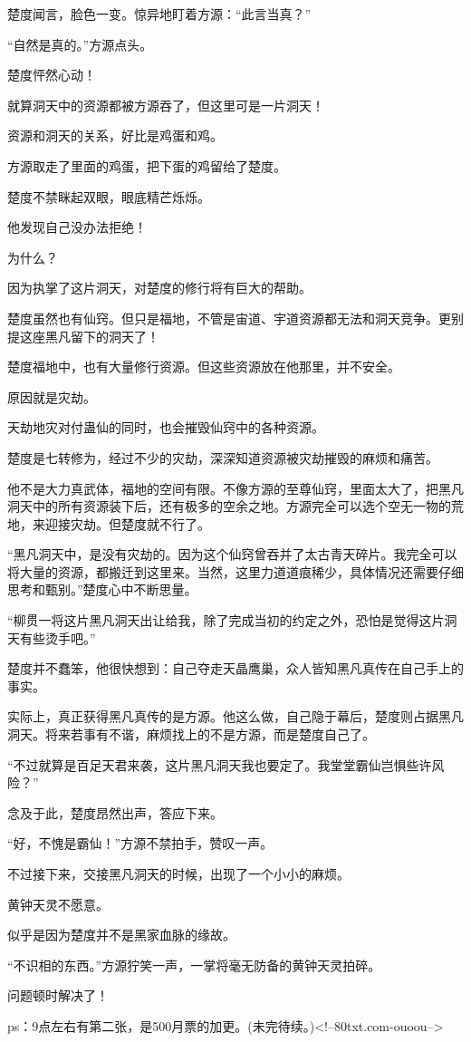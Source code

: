 \begin{this_body}
楚度闻言，脸色一变。惊异地盯着方源：“此言当真？”

“自然是真的。”方源点头。

楚度怦然心动！

就算洞天中的资源都被方源吞了，但这里可是一片洞天！

资源和洞天的关系，好比是鸡蛋和鸡。

方源取走了里面的鸡蛋，把下蛋的鸡留给了楚度。

楚度不禁眯起双眼，眼底精芒烁烁。

他发现自己没办法拒绝！

为什么？

因为执掌了这片洞天，对楚度的修行将有巨大的帮助。

楚度虽然也有仙窍。但只是福地，不管是宙道、宇道资源都无法和洞天竞争。更别提这座黑凡留下的洞天了！

楚度福地中，也有大量修行资源。但这些资源放在他那里，并不安全。

原因就是灾劫。

天劫地灾对付蛊仙的同时，也会摧毁仙窍中的各种资源。

楚度是七转修为，经过不少的灾劫，深深知道资源被灾劫摧毁的麻烦和痛苦。

他不是大力真武体，福地的空间有限。不像方源的至尊仙窍，里面太大了，把黑凡洞天中的所有资源装下后，还有极多的空余之地。方源完全可以选个空无一物的荒地，来迎接灾劫。但楚度就不行了。

“黑凡洞天中，是没有灾劫的。因为这个仙窍曾吞并了太古青天碎片。我完全可以将大量的资源，都搬迁到这里来。当然，这里力道道痕稀少，具体情况还需要仔细思考和甄别。”楚度心中不断思量。

“柳贯一将这片黑凡洞天出让给我，除了完成当初的约定之外，恐怕是觉得这片洞天有些烫手吧。”

楚度并不蠢笨，他很快想到：自己夺走天晶鹰巢，众人皆知黑凡真传在自己手上的事实。

实际上，真正获得黑凡真传的是方源。他这么做，自己隐于幕后，楚度则占据黑凡洞天。将来若事有不谐，麻烦找上的不是方源，而是楚度自己了。

“不过就算是百足天君来袭，这片黑凡洞天我也要定了。我堂堂霸仙岂惧些许风险？”

念及于此，楚度昂然出声，答应下来。

“好，不愧是霸仙！”方源不禁拍手，赞叹一声。

不过接下来，交接黑凡洞天的时候，出现了一个小小的麻烦。

黄钟天灵不愿意。

似乎是因为楚度并不是黑家血脉的缘故。

“不识相的东西。”方源狞笑一声，一掌将毫无防备的黄钟天灵拍碎。

问题顿时解决了！

ps：9点左右有第二张，是500月票的加更。(未完待续。)<!--80txt.com-ouoou-->

\end{this_body}

